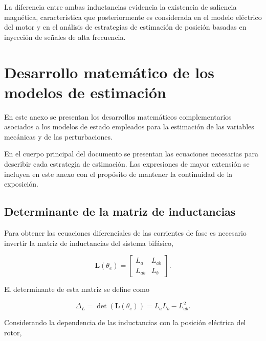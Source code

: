 La diferencia entre ambas inductancias evidencia la existencia de
saliencia magnética, característica que posteriormente es considerada
en el modelo eléctrico del motor y en el análisis de estrategias de
estimación de posición basadas en inyección de señales de alta
frecuencia.

\clearpage



\chapter{Desarrollo matemático de los modelos de estimación}
\label{anexo:modelos_estimacion}

En este anexo se presentan los desarrollos matemáticos complementarios
asociados a los modelos de estado empleados para la estimación de las
variables mecánicas y de las perturbaciones.

En el cuerpo principal del documento se presentan las ecuaciones
necesarias para describir cada estrategia de estimación. Las
expresiones de mayor extensión se incluyen en este anexo con el
propósito de mantener la continuidad de la exposición.
\section{Determinante de la matriz de inductancias}
\label{anexo:determinante_inductancias}

Para obtener las ecuaciones diferenciales de las corrientes de fase
es necesario invertir la matriz de inductancias del sistema bifásico,

\begin{equation}
    \mathbf{L}(\theta_e)=
    \begin{bmatrix}
        L_a & L_{ab} \\
        L_{ab} & L_b
    \end{bmatrix}.
\end{equation}

El determinante de esta matriz se define como

\begin{equation}
    \Delta_L
    =
    \det\left(\mathbf{L}(\theta_e)\right)
    =
    L_aL_b-L_{ab}^{2}.
\end{equation}

Considerando la dependencia de las inductancias con la posición
eléctrica del rotor,

